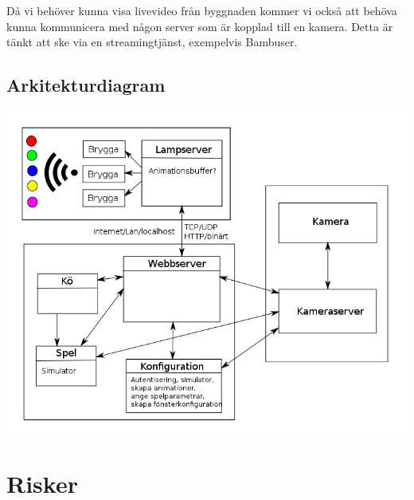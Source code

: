 \documentclass[a4paper,11pt]{article}
\begin{document}
  Då vi behöver kunna visa livevideo från byggnaden kommer vi också att behöva
  kunna kommunicera med någon server som är kopplad till en kamera.  Detta är
  tänkt att ske via en streamingtjänst, exempelvis Bambuser.


\subsection{Arkitekturdiagram}

  \includegraphics[width=\textwidth]{component_diagram.png}



\section{Risker}
\end{document}
